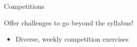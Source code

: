 \documentclass[aspectratio=169]{beamer}
\begin{document}

\begin{frame}[fragile]{Competitions}
\centerline{\Large{\alert{Offer challenges to go beyond the syllabus!}}}
\pause
\begin{itemize}[<+->]
\item Diverse, weekly competition exercises
\end{itemize}
\end{frame}
\end{document}
